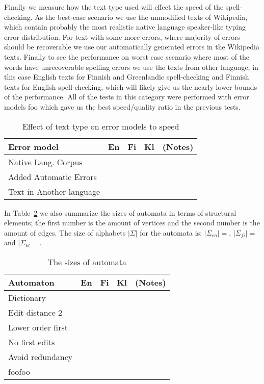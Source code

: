 \documentclass[11pt]{article}
\begin{document}
Finally we measure how the text type used will effect the speed of the
spell-checking. As the best-case scenario we use the unmodified texts of
Wikipedia, which contain probably the most realistic native language
speaker-like typing error distribution. For text with some more errors, where
majority of errors should be recoverable we use our automatically generated
errors in the Wikipedia texts. Finally to see the performance on worst case
scenario where most of the words have unrecoverable spelling errors we use the
texts from other language, in this case English texts for Finnish and 
Greenlandic spell-checking and Finnish texts for English spell-checking, which
will likely give us the nearly lower bounds of the performance. All of the
tests in this category were performed with error models foo which gave us 
the best speed/quality ratio in the previous tests.

\begin{table}[h]
\begin{center}
\begin{scriptsize}
\begin{tabular}{|l|rrrl|}
\hline
\bf Error model & \bf En & \bf Fi & \bf Kl & (Notes) \\ 
\hline
Native Lang. Corpus      & & & & \\
Added Automatic Errors   & & & & \\
Text in Another language & & & & \\
\hline
\end{tabular}
\end{scriptsize}
\end{center}
\caption{\label{table:language-vs-text-type} Effect of text type on
error models to speed}
\end{table}

In Table~\ref{table:automata-sizes} we also summarize the sizes of automata in
terms of structural elements; the first number is the amount of vertices and the
second number is the amount of edges. The size of alphabets $|\Sigma|$
for the automata is: $|\Sigma_{en}| = $, $|\Sigma_{fi}| = $ and $|\Sigma_{kl} =
$.

\begin{table}[h]
\begin{center}
\begin{scriptsize}
\begin{tabular}{|l|rrrl|}
\hline
\bf Automaton & \bf En & \bf Fi & \bf Kl & (Notes) \\ 
\hline
Dictionary        & & & & \\
Edit distance 2   & & & & \\
Lower order first & & & & \\
No first edits    & & & & \\
Avoid redundancy  & & & & \\
foofoo            & & & & \\
\hline
\end{tabular}
\end{scriptsize}
\end{center}
\caption{\label{table:automata-sizes} The sizes of automata}
\end{table}
\end{document}
